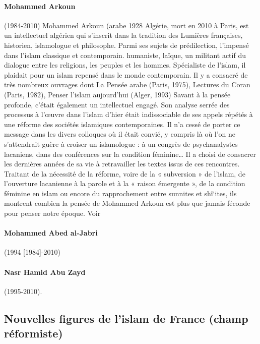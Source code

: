 \paragraph{Mohammed Arkoun}(1984-2010)
 Mohammed Arkoun (arabe   1928 Algérie, mort en 2010 à
Paris, est un intellectuel algérien qui s'inscrit dans la tradition des
Lumières françaises, historien, islamologue et philosophe. Parmi ses
sujets de prédilection, l'impensé dans l'islam classique et
contemporain. humaniste, laïque, un militant actif du dialogue entre
les religions, les peuples et les hommes. Spécialiste de l'islam, il
plaidait pour un islam repensé dans le monde contemporain. Il y a
consacré de très nombreux ouvrages dont La Pensée arabe (Paris, 1975),
Lectures du Coran (Paris, 1982), Penser l'islam aujourd'hui (Alger, 1993)
Savant à la pensée profonde, c'était également un intellectuel engagé. Son analyse serrée des processus à l’œuvre dans l’islam d’hier était indissociable de ses appels répétés à une réforme des sociétés islamiques contemporaines. Il n’a cessé de porter ce message dans les divers colloques où il était convié, y compris là où l’on ne s’attendrait guère à croiser un islamologue : à un congrès de psychanalystes lacaniens, dans des conférences sur la condition féminine…
Il a choisi de consacrer les dernières années de sa vie à retravailler les textes issus de ces rencontres. Traitant de la nécessité de la réforme, voire de la « subversion » de l’islam, de l’ouverture lacanienne à la parole et à la « raison émergente », de la condition féminine en islam ou encore du rapprochement entre sunnites et shî‘ites, ils montrent combien la pensée de Mohammed Arkoun est plus que jamais féconde pour penser notre époque.
Voir   
\label{theol:Arkoun3}
\paragraph{Mohammed Abed al-Jabri} (1994 [1984]-2010)
\paragraph{Nasr Hamid Abu Zayd} (1995-2010).


\subsection{Nouvelles figures de l’islam de France (champ réformiste)}

